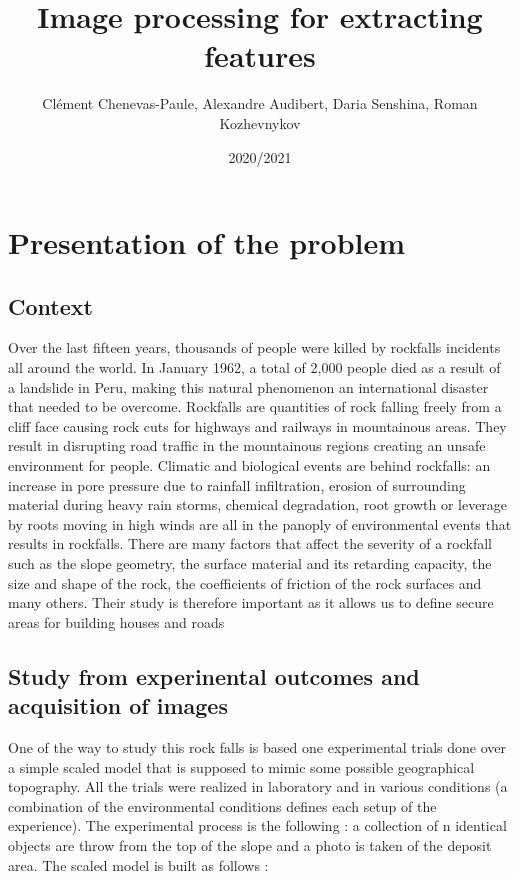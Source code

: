 \documentclass{article}
\title{\textbf{Image processing for extracting features}}
\author{Clément Chenevas-Paule, Alexandre Audibert, Daria Senshina, Roman Kozhevnykov}
\date{2020/2021}
\begin{document}
\setlength\parindent{0pt}

\begin{titlepage}
\maketitle
\end{titlepage}




\tableofcontents
\newpage


\section{Presentation of the problem}
\noindent
\subsection{Context}

Over the last fifteen years, thousands of people were killed by rockfalls incidents all
around the world. In January 1962, a total of 2,000 people died as a result of a landslide in
Peru, making this natural phenomenon an international disaster that needed to be overcome. Rockfalls are quantities of rock falling freely from a cliff face causing rock cuts for
highways and railways in mountainous areas. They result in disrupting road traffic in the
mountainous regions creating an unsafe environment for people. Climatic and biological
events are behind rockfalls: an increase in pore pressure due to rainfall infiltration, erosion
of surrounding material during heavy rain storms, chemical degradation, root growth or
leverage by roots moving in high winds are all in the panoply of environmental events
that results in rockfalls. There are many factors that affect the severity of a rockfall such
as the slope geometry, the surface material and its retarding capacity, the size and shape
of the rock, the coefficients of friction of the rock surfaces and many others. Their study
is therefore important as it allows us to define secure areas for building houses and roads

\subsection{Study from experinental outcomes and acquisition of images}

One of the way to study this rock falls is based one experimental trials done over
a simple scaled model that is supposed to mimic some possible geographical topography. All the trials were realized in laboratory and in various conditions (a combination
of the environmental conditions defines each setup of the experience). The experimental process is the following : a collection of n identical objects are throw from the top
of the slope and a photo is taken of the deposit area. The scaled model is built as follows :\\
\end{document}

